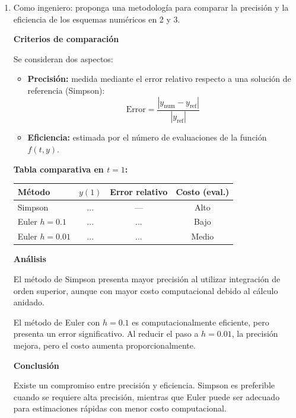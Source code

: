 \begin{enumerate}
\begin{respuesta}[title=Punto 3 — Método de Euler]
        \[
        y(1) \approx \text{(valor numérico)}
        \]

        \end{respuesta}

    \item Como ingeniero: proponga una metodología para comparar la precisión y la
    eficiencia de los esquemas numéricos en 2 y 3.
        \begin{respuesta}[title=Punto 4 — Comparación de Métodos]

        \textbf{Criterios de comparación}

        Se consideran dos aspectos:

        \begin{itemize}
        \item \textbf{Precisión:} medida mediante el error relativo respecto a una solución de referencia (Simpson):
        \[
        \text{Error} = \frac{|y_{\text{num}} - y_{\text{ref}}|}{|y_{\text{ref}}|}
        \]

        \item \textbf{Eficiencia:} estimada por el número de evaluaciones de la función $f(t,y)$.
        \end{itemize}

        \textbf{Tabla comparativa en $t=1$:}

        \begin{center}
        \begin{tabular}{lccc}
        \toprule
        Método & $y(1)$ & Error relativo & Costo (eval.) \\
        \midrule
        Simpson           & ... & --- & Alto \\
        Euler $h=0.1$     & ... & ... & Bajo \\
        Euler $h=0.01$    & ... & ... & Medio \\
        \bottomrule
        \end{tabular}
        \end{center}

        \textbf{Análisis}

        El método de Simpson presenta mayor precisión al utilizar integración de orden superior,
        aunque con mayor costo computacional debido al cálculo anidado.

        El método de Euler con $h=0.1$ es computacionalmente eficiente, pero presenta un error significativo.
        Al reducir el paso a $h=0.01$, la precisión mejora, pero el costo aumenta proporcionalmente.

        \textbf{Conclusión}

        Existe un compromiso entre precisión y eficiencia. Simpson es preferible cuando se requiere alta precisión,
        mientras que Euler puede ser adecuado para estimaciones rápidas con menor costo computacional.

        \end{respuesta}
\end{enumerate}

\newpage
